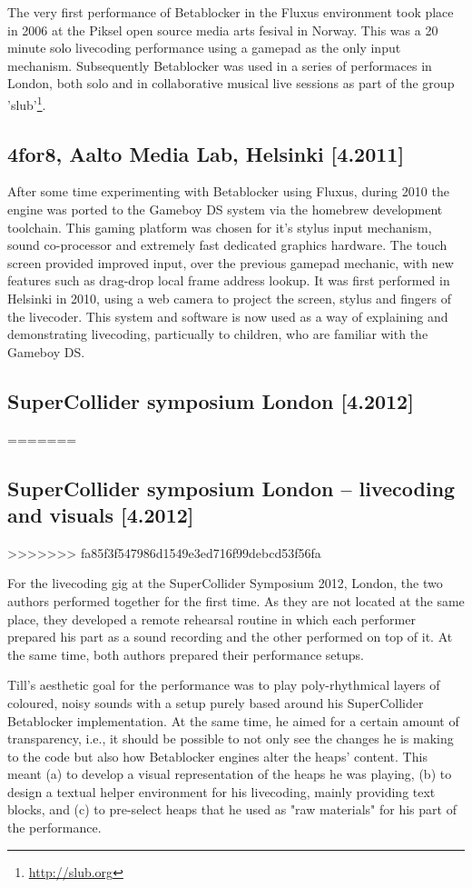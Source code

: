 \documentclass[letterpaper, 12pt]{article}
\begin{document}
The very first performance of Betablocker in the Fluxus environment took place in 2006 at the Piksel open source media arts fesival in Norway. This was a 20 minute solo livecoding performance using a gamepad as the only input mechanism. Subsequently Betablocker was used in a series of performaces in London, both solo and in collaborative musical live sessions as part of the group 'slub'\footnote{\url{http://slub.org}}. 

\subsection{4for8, Aalto Media Lab, Helsinki [4.2011]}
\label{sub:4for8}

After some time experimenting with Betablocker using Fluxus, during 2010 the engine was ported to the Gameboy DS system via the homebrew development toolchain. This gaming platform was chosen for it's stylus input mechanism, sound co-processor and extremely fast dedicated graphics hardware. The touch screen provided improved input, over the previous gamepad mechanic, with new features such as drag-drop local frame address lookup. It was first performed in Helsinki in 2010, using a web camera to project the screen, stylus and fingers of the livecoder. This system and software is now used as a way of explaining and demonstrating livecoding, particually to children, who are familiar with the Gameboy DS.


\subsection{SuperCollider symposium London [4.2012]}
=======
\parskip 18pt

\subsection{SuperCollider symposium London -- livecoding and visuals [4.2012]}
>>>>>>> fa85f3f547986d1549e3ed716f99debcd53f56fa
\label{sub:livecoding_and_visuals}

For the livecoding gig at the SuperCollider Symposium 2012, London, the two authors performed together for the first time. 
As they are not located at the same place, they developed a remote rehearsal routine in which each performer prepared his part as a sound recording and the other performed on top of it.
At the same time, both authors prepared their performance setups.

Till's aesthetic goal for the performance was to play poly-rhythmical layers of coloured, noisy sounds with a setup purely based around his SuperCollider Betablocker implementation. 
At the same time, he aimed for a certain amount of transparency, i.e., it should be possible to not only see the changes he is making to the code but also how  Betablocker engines alter the heaps' content.
This meant 
(a) to develop a visual representation of the heaps he was playing, 
(b) to design a textual helper environment for his livecoding, mainly providing text blocks, and
(c) to pre-select heaps that he used as "raw materials" for his part of the  performance.
\end{document}
